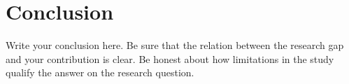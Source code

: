 \section{Conclusion}
\label{sec:conclusion}
Write your conclusion here. Be sure that the relation between the research gap and your contribution is clear. Be honest about how limitations in the study qualify the answer on the research question.